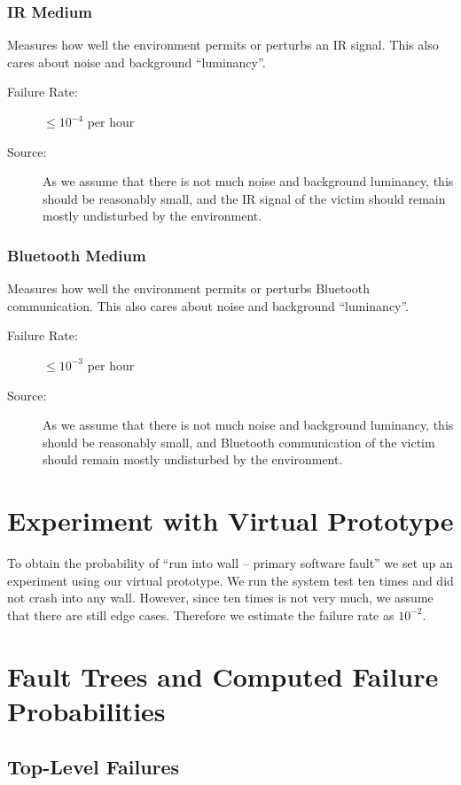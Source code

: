 \documentclass[a4paper,parskip,headheight=38pt]{scrartcl} %
\begin{document}
\subsubsection{IR Medium}
Measures how well the environment permits or perturbs an IR signal.
This also cares about noise and background \enquote{luminancy}.
\begin{description}
\item[Failure Rate:] $\leq 10^{-4}$ per hour
\item[Source:] As we assume that there is not much noise and background
luminancy, this should be reasonably small, and the IR signal of the
victim should remain mostly undisturbed by the environment.
\end{description}

\subsubsection{Bluetooth Medium}
Measures how well the environment permits or perturbs Bluetooth communication.
This also cares about noise and background \enquote{luminancy}.
\begin{description}
\item[Failure Rate:] $\leq 10^{-3}$ per hour
\item[Source:] As we assume that there is not much noise and background
luminancy, this should be reasonably small, and Bluetooth communication
of the victim should remain mostly undisturbed by the environment.
\end{description}

\section{Experiment with Virtual Prototype}
To obtain the probability of \enquote{run into wall – primary software fault} we set up an experiment using our virtual prototype. We run the system test ten times and did not crash into any wall. However, since ten times is not very much, we assume that there are still edge cases. Therefore we estimate the failure rate as $10^{-2}$.


\section{Fault Trees and Computed Failure Probabilities}

\subsection*{Top-Level Failures}
\end{document}
